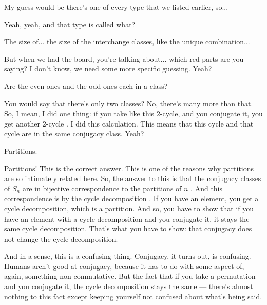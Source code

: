 \begin{student}
My guess would be there's one of every type that we listed earlier, so...
\end{student}

\begin{speech}[01:19:35 - 01:19:38]
Yeah, yeah, and that type is called what?
\end{speech}

\begin{student}
The size of... the size of the interchange classes, like the unique combination...
\end{student}

\begin{speech}[01:19:45 - 01:19:59]
But when we had the board, you're talking about... which red parts are you saying? I don't know, we need some more specific guessing. Yeah?
\end{speech}

\begin{student}
Are the even ones and the odd ones each in a class?
\end{student}

\begin{speech}[01:20:03 - 01:20:26]
You would say that there's only two classes? No, there's many more than that. So, I mean, I did one thing: if you take like this $2$-cycle, and you conjugate it, you get another $2$-cycle . I did this calculation. This means that this cycle  and that cycle  are in the same conjugacy class. Yeah?
\end{speech}

\begin{student}
Partitions.
\end{student}

\begin{speech}[01:20:28 - 01:21:37]
Partitions! This is the correct answer. This is one of the reasons why partitions are so intimately related here. So, the answer to this is that the conjugacy classes of $S_n$ are in bijective correspondence to the partitions of $n$ . And this correspondence is by the cycle decomposition . If you have an element, you get a cycle decomposition, which is a partition. And so, you have to show that if you have an element with a cycle decomposition and you conjugate it, it stays the same cycle decomposition. That's what you have to show: that conjugacy does not change the cycle decomposition.

And in a sense, this is a confusing thing. Conjugacy, it turns out, is confusing. Humans aren't good at conjugacy, because it has to do with some aspect of, again, something non-commutative. But the fact that if you take a permutation and you conjugate it, the cycle decomposition stays the same --- there's almost nothing to this fact except keeping yourself not confused about what's being said.
\end{speech}

